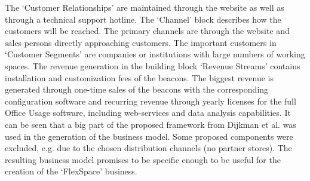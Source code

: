 		\vspace{-1em}
		The `Customer Relationships' are maintained through the website as well as through a technical support hotline. The `Channel' block describes how the customers will be reached. The primary channels are through the website and sales persons directly approaching customers. The important customers in `Customer Segments' are companies or institutions with large numbers of working spaces. The revenue generation in the building block `Revenue Streams' contains installation and customization fees of the beacons. The biggest revenue is generated through one-time sales of the beacons with the corresponding configuration software and recurring revenue through yearly licenses for the full Office Usage software, including web-services and data analysis capabilities. It can be seen that a big part of the proposed framework from Dijkman et al. was used in the generation of the business model. Some proposed components were excluded, e.g. due to the chosen distribution channels (no partner stores). The resulting business model promises to be specific enough to be useful for the creation of the `FlexSpace' business.
	\vspace{-1em}
